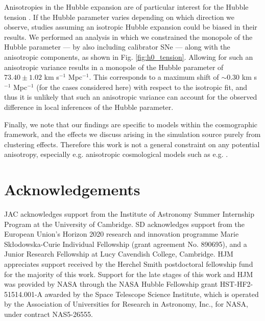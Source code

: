 \documentclass[fleqn,usenatbib]{mnras}
\newcommand{\hay}[1]{{\color[rgb]{0.7,0.0,0.7} {\textbf{[HMC: #1]}}}}
\newcommand{\hayt}[1]{{\color[rgb]{0.7,0.0,0.7} {#1}}}
\begin{document}
{{Anisotropies in the Hubble expansion are of particular interest for the Hubble tension \citep{Macpherson_Heinesen_2021}. If the Hubble parameter varies depending on which direction we observe, studies assuming an isotropic Hubble expansion could be biased in their results. We performed an analysis in which we constrained the monopole of the Hubble parameter --- by also including calibrator SNe --- along with the anisotropic components, as shown in Fig. \ref{fig:h0_tension}. Allowing for such an anisotropic variance results in a monopole of the Hubble parameter of {$73.40 \pm 1.02$ km s$^{-1}$ Mpc$^{-1}$. }This corresponds to a maximum shift of {$\sim 0.30$ km s$^{-1}$ Mpc$^{-1}$} (for the cases considered here) with respect to the isotropic fit, and thus it is unlikely that such an anisotropic variance can account for the observed difference in local inferences of the Hubble parameter. 
}}

Finally, we note that our findings are specific to models within the cosmographic framework, and the effects we discuss arising in the simulation source purely from clustering effects. Therefore this work is not a general constraint on any potential anisotropy, especially e.g. anisotropic cosmological models such as e.g. \citet{Lavinto:Tardis, constantin2022spatially}.  


\section*{Acknowledgements}

JAC acknowledges support from the Institute of Astronomy Summer Internship Program at the University of Cambridge.
SD acknowledges support from the European Union's Horizon 2020 research and innovation programme Marie Skłodowska-Curie Individual Fellowship (grant agreement No. 890695), and a Junior Research Fellowship at Lucy Cavendish College, Cambridge. 
HJM appreciates support received by the Herchel Smith postdoctoral fellowship fund for the majority of this work. Support for the late stages of this work and HJM was provided by NASA through the NASA Hubble Fellowship grant HST-HF2-51514.001-A awarded by the Space Telescope Science Institute, which is operated by the Association of Universities for Research in Astronomy, Inc., for NASA, under contract NAS5-26555.
\end{document}
